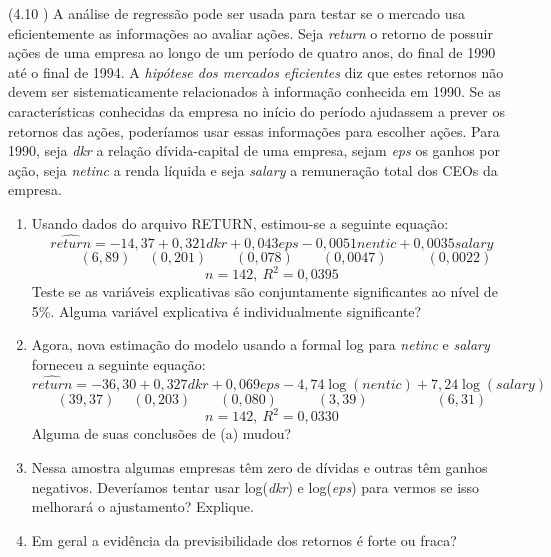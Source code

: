 \documentclass[12pt,letterpaper, onecolumn]{exam}
\begin{document}
\begin{questions}
\question\qstar (4.10 \citep{wooldridge2016}) A análise de regressão pode ser usada para testar se o mercado usa eficientemente as informações ao avaliar ações. Seja \textit{return} o retorno de possuir ações de uma empresa ao longo de um período de quatro anos, do final de 1990 até o final de 1994. A \textit{hipótese dos mercados eficientes} diz que estes retornos não devem ser sistematicamente relacionados à informação conhecida em 1990. Se as características conhecidas da empresa no início do período ajudassem a prever os retornos das ações, poderíamos usar essas informações para escolher ações.
Para 1990, seja \textit{dkr} a relação dívida-capital de uma empresa, sejam \textit{eps} os ganhos por ação, seja \textit{netinc} a renda líquida e seja \textit{salary} a remuneração total dos CEOs da empresa.
\begin{enumerate}[label = (\alph*)]
    \item Usando dados do arquivo RETURN, estimou-se a seguinte equação:
    \begin{equation*}
        \widehat{return} = -14,37 + 0,321dkr + 0,043eps - 0,0051nentic + 0,0035 salary
    \end{equation*}\vspace{-2em}\begin{equation*}
        \phantom{--} (6,89) \phantom{-}(0,201) \phantom{--} (0,078) \phantom{--} (0,0047) \phantom{---} (0,0022)
    \end{equation*}\begin{equation*}
        n = 142, \ R^2 = 0,0395
    \end{equation*} Teste se as variáveis explicativas são conjuntamente significantes ao nível de 5\%. Alguma variável explicativa é individualmente significante?
    \item Agora, nova estimação do modelo usando a formal log para \textit{netinc} e \textit{salary} forneceu a seguinte equação:    \begin{equation*}
        \widehat{return} = -36,30 + 0,327dkr + 0,069eps - 4,74\log(nentic) + 7,24 \log(salary)
    \end{equation*}\vspace{-2em}\begin{equation*}
        \phantom{} (39,37) \phantom{-}(0,203) \phantom{--} (0,080) \phantom{---} (3,39) \phantom{-----} (6,31)
    \end{equation*}\begin{equation*}
        n = 142, \ R^2 = 0,0330
    \end{equation*}Alguma de suas conclusões de (a) mudou?
    \item Nessa amostra algumas empresas têm zero de dívidas e outras têm ganhos negativos. Deveríamos tentar usar log(\textit{dkr}) e log(\textit{eps}) para vermos se isso melhorará o ajustamento? Explique.
    \item Em geral a evidência da previsibilidade dos retornos é forte ou fraca?
\end{enumerate}
\
\



\end{questions}
\end{document}
